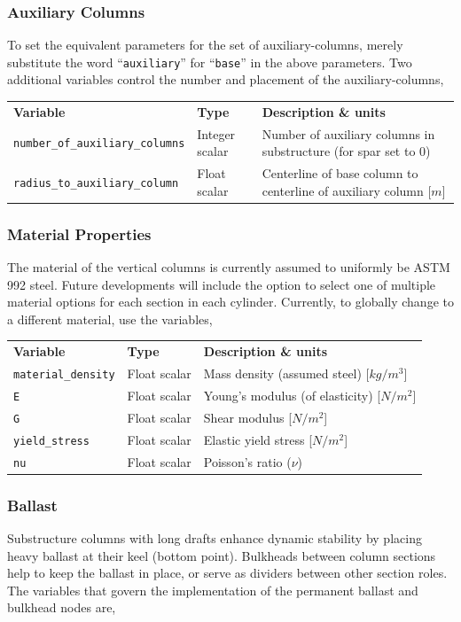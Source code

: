 \subsubsection{Auxiliary Columns}
To set the equivalent parameters for the set of
auxiliary-columns, merely substitute the word
``\texttt{auxiliary}'' for ``\texttt{base}'' in the above parameters.  Two
additional variables control the number and placement of the
auxiliary-columns,

{\footnotesize
  \begin{tabularx}{\linewidth}{ l l X }
    \textbf{Variable} & \textbf{Type} & \textbf{Description \& units} \\
    \texttt{number\_of\_auxiliary\_columns} & Integer scalar & Number of auxiliary columns in substructure (for spar set to 0)\\
    \texttt{radius\_to\_auxiliary\_column} & Float scalar & Centerline of base column to centerline of auxiliary column [$m$]\\
  \end{tabularx}
}

\subsubsection{Material Properties}
The material of the vertical columns is currently assumed to uniformly
be ASTM 992 steel.  Future developments will include the option to
select one of multiple material options for each section in each
cylinder.  Currently, to globally change to a different material, use
the variables,

{\footnotesize
  \begin{tabularx}{\linewidth}{ l l X }
    \textbf{Variable} & \textbf{Type} & \textbf{Description \& units} \\
    \texttt{material\_density} & Float scalar & Mass density (assumed steel) [$kg/m^3$]\\
    \texttt{E} & Float scalar & Young's modulus (of elasticity) [$N/m^2$]\\
    \texttt{G} & Float scalar & Shear modulus [$N/m^2$]\\
    \texttt{yield\_stress} & Float scalar & Elastic yield stress [$N/m^2$]\\
    \texttt{nu} & Float scalar & Poisson's ratio ($\nu$)\\
  \end{tabularx}
}

\subsubsection{Ballast}
Substructure columns with long drafts enhance dynamic stability by placing heavy
ballast at their keel (bottom point).  Bulkheads between column sections
help to keep the ballast in place, or serve as dividers between other
section roles.  The variables that govern the implementation of the
permanent ballast and bulkhead nodes are,

